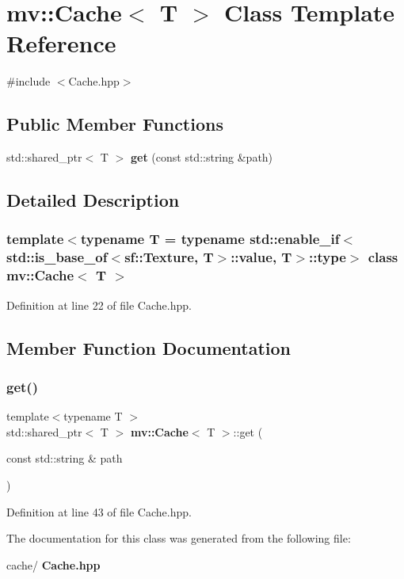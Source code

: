\section{mv\+:\+:Cache$<$ T $>$ Class Template Reference}
\label{classmv_1_1_cache}


{\ttfamily \#include $<$Cache.\+hpp$>$}

\subsection*{Public Member Functions}
\begin{DoxyCompactItemize}
\item 
std\+::shared\+\_\+ptr$<$ T $>$ \textbf{ get} (const std\+::string \&path)
\end{DoxyCompactItemize}


\subsection{Detailed Description}
\subsubsection*{template$<$typename T = typename std\+::enable\+\_\+if$<$ std\+::is\+\_\+base\+\_\+of$<$sf\+::\+Texture, T$>$\+::value, T$>$\+::type$>$\newline
class mv\+::\+Cache$<$ T $>$}



Definition at line 22 of file Cache.\+hpp.



\subsection{Member Function Documentation}
\mbox{\label{classmv_1_1_cache_a05015c7693daffad052ca4eecb65ee3c}} 
\subsubsection{get()}
{\footnotesize\ttfamily template$<$typename T $>$ \\
std\+::shared\+\_\+ptr$<$ T $>$ \textbf{ mv\+::\+Cache}$<$ T $>$\+::get (\begin{DoxyParamCaption}\item[{const std\+::string \&}]{path }\end{DoxyParamCaption})\hspace{0.3cm}{\ttfamily [inline]}}



Definition at line 43 of file Cache.\+hpp.



The documentation for this class was generated from the following file\+:\begin{DoxyCompactItemize}
\item 
cache/\textbf{ Cache.\+hpp}\end{DoxyCompactItemize}
